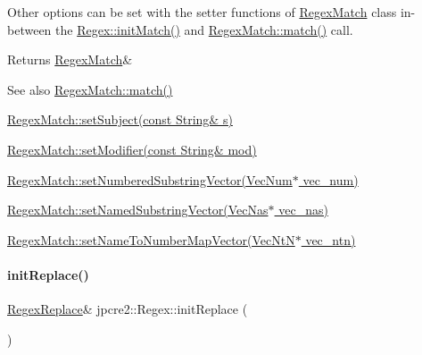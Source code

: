 Other options can be set with the setter functions of \hyperlink{classjpcre2_1_1RegexMatch}{Regex\+Match} class in-\/between the \hyperlink{classjpcre2_1_1Regex_a519b0915bf1163c6ce6a4d674b30cfcd_a519b0915bf1163c6ce6a4d674b30cfcd}{Regex\+::init\+Match()} and \hyperlink{classjpcre2_1_1RegexMatch_a5868aef3a146594ea1ebef34d122bb33_a5868aef3a146594ea1ebef34d122bb33}{Regex\+Match\+::match()} call. \begin{DoxyReturn}{Returns}
\hyperlink{classjpcre2_1_1RegexMatch}{Regex\+Match}\& 
\end{DoxyReturn}
\begin{DoxySeeAlso}{See also}
\hyperlink{classjpcre2_1_1RegexMatch_a5868aef3a146594ea1ebef34d122bb33_a5868aef3a146594ea1ebef34d122bb33}{Regex\+Match\+::match()} 

\hyperlink{classjpcre2_1_1RegexMatch_a635c652195deaa8ebb9e107c4f972aab_a635c652195deaa8ebb9e107c4f972aab}{Regex\+Match\+::set\+Subject(const String\& s)} 

\hyperlink{classjpcre2_1_1RegexMatch_a9df7e92f96b61553f62720cb8f5f23e5_a9df7e92f96b61553f62720cb8f5f23e5}{Regex\+Match\+::set\+Modifier(const String\& mod)} 

\hyperlink{classjpcre2_1_1RegexMatch_a2c7efe1ec2e13827f670db4ecedcd0a0_a2c7efe1ec2e13827f670db4ecedcd0a0}{Regex\+Match\+::set\+Numbered\+Substring\+Vector(\+Vec\+Num$\ast$ vec\+\_\+num)} 

\hyperlink{classjpcre2_1_1RegexMatch_ae495431f57cae54363331237ab21b56c_ae495431f57cae54363331237ab21b56c}{Regex\+Match\+::set\+Named\+Substring\+Vector(\+Vec\+Nas$\ast$ vec\+\_\+nas)} 

\hyperlink{classjpcre2_1_1RegexMatch_a04926e61d8b5f1d8bdf344efecd567d8_a04926e61d8b5f1d8bdf344efecd567d8}{Regex\+Match\+::set\+Name\+To\+Number\+Map\+Vector(\+Vec\+Nt\+N$\ast$ vec\+\_\+ntn)} 
\end{DoxySeeAlso}
\hypertarget{classjpcre2_1_1Regex_ae7235a991492fa88f1bd3fb02d59cd0a_ae7235a991492fa88f1bd3fb02d59cd0a}{}\label{classjpcre2_1_1Regex_ae7235a991492fa88f1bd3fb02d59cd0a_ae7235a991492fa88f1bd3fb02d59cd0a} 
\paragraph{\texorpdfstring{init\+Replace()}{initReplace()}}
{\footnotesize\ttfamily \hyperlink{classjpcre2_1_1RegexReplace}{Regex\+Replace}\& jpcre2\+::\+Regex\+::init\+Replace (\begin{DoxyParamCaption}{ }\end{DoxyParamCaption})\hspace{0.3cm}{\ttfamily [inline]}}



